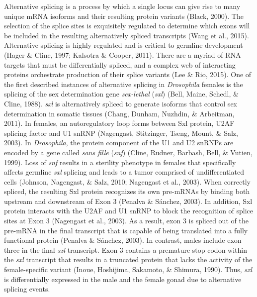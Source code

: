 \documentclass[12pt,oneside]{reedthesis}
\begin{document}
Alternative splicing is a process by which a single locus can give rise
to many unique mRNA isoforms and their resulting protein variants
(Black, 2000). The selection of the splice sites is exquisitely
regulated to determine which exons will be included in the resulting
alternatively spliced transcripts (Wang et al., 2015). Alternative splicing
is highly regulated and is critical to germline development
(Hager \& Cline, 1997; Kalsotra \& Cooper, 2011). There are a myriad of RNA targets that
must be differentially spliced, and a complex web of interacting
proteins orchestrate production of their splice variants (Lee \& Rio, 2015).
One of the first described instances of alternative splicing in
\emph{Drosophila} females is the splicing of the sex determination gene
\emph{sex-lethal} (\emph{sxl}) (Bell, Maine, Schedl, \& Cline, 1988). \emph{sxl} is alternatively spliced to
generate isoforms that control sex determination in somatic tissues
(Chang, Dunham, Nuzhdin, \& Arbeitman, 2011). In females, an autoregulatory loop forms between Sxl
protein, U2AF splicing factor and U1 snRNP (Nagengast, Stitzinger, Tseng, Mount, \& Salz, 2003). In
\emph{Drosophila}, the protein component of the U1 and U2 snRNPs are encoded
by a gene called \emph{sans fille} (\emph{snf}) (Cline, Rudner, Barbash, Bell, \& Vutien, 1999). Loss of \emph{snf}
results in a sterility phenotype in females that specifically affects
germline \emph{sxl} splicing and leads to a tumor comprised of
undifferentiated cells (Johnson, Nagengast, \& Salz, 2010; Nagengast et al., 2003). When
correctly spliced, the resulting Sxl protein recognizes its own
pre-mRNAs by binding both upstream and downstream of Exon 3
(Penalva \& Sánchez, 2003). In addition, Sxl protein interacts with the U2AF and
U1 snRNP to block the recognition of splice sites at Exon 3
(Nagengast et al., 2003). As a result, exon 3 is spliced out of the pre-mRNA
in the final transcript that is capable of being translated into a fully
functional protein (Penalva \& Sánchez, 2003). In contrast, males include exon
three in the final \emph{sxl} transcript. Exon 3 contains a premature stop
codon within the \emph{sxl} transcript that results in a truncated protein
that lacks the activity of the female-specific variant (Inoue, Hoshijima, Sakamoto, \& Shimura, 1990).
Thus, \emph{sxl} is differentially expressed in the male and the female gonad
due to alternative splicing events.
\end{document}
